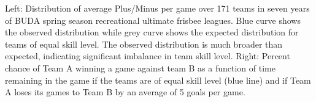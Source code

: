 Left: Distribution of average Plus/Minus per game over 171 teams in seven years of BUDA spring season recreational ultimate frisbee leagues.  Blue curve shows the observed distribution while grey curve shows the expected distribution for teams of equal skill level. The observed distribution is much broader than expected, indicating significant imbalance in team skill level. Right: Percent chance of Team A winning a game against team B as a function of time remaining in the game if the teams are of equal skill level (blue line) and if Team A loses its games to Team B by an average of 5 goals per game.  
